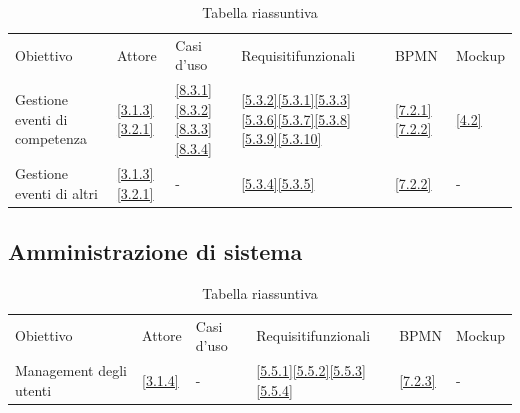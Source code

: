 \documentclass{article}
\begin{document}
\begin{table}[htbp]
    \centering
    \begin{tabularx}{\textwidth}{|X|X|X|X|X|X|}
        \Xhline{2pt} %
        Obiettivo & Attore & Casi d'uso & Requisiti\newline funzionali & BPMN & Mockup \\
        \Xhline{2pt} %
        Gestione eventi di competenza & \ref{3.1.3}\newline\ref{3.2.1} & \ref{8.3.1}\newline\ref{8.3.2}\newline\ref{8.3.3}\newline\ref{8.3.4} & \ref{5.3.2}\newline\ref{5.3.1}\newline\ref{5.3.3}\newline\ref{5.3.6}\newline\ref{5.3.7}\newline\ref{5.3.8}\newline\ref{5.3.9}\newline\ref{5.3.10} & \ref{7.2.1}\newline\ref{7.2.2} & \ref{4.2} \\
        \hline
        Gestione eventi di altri & \ref{3.1.3}\newline\ref{3.2.1} & - & \ref{5.3.4}\newline\ref{5.3.5} & \ref{7.2.2} & -\\
        \hline
    \end{tabularx}
    \caption{Tabella riassuntiva}
    \label{tab:TabellaDesktop}
\end{table}

\clearpage

\subsection{Amministrazione di sistema}

\begin{table}[htbp]
    \centering
    \begin{tabularx}{\textwidth}{|X|X|X|X|X|X|}
        \Xhline{2pt} %
        Obiettivo & Attore & Casi d'uso & Requisiti\newline funzionali & BPMN & Mockup \\
        \Xhline{2pt} %
        Management degli utenti & \ref{3.1.4} & - & \ref{5.5.1}\newline\ref{5.5.2}\newline\ref{5.5.3}\newline\ref{5.5.4} & \ref{7.2.3} & - \\
        \hline
    \end{tabularx}
    \caption{Tabella riassuntiva}
    \label{tab:TabellaAmministrazione}
\end{table}
\end{document}
